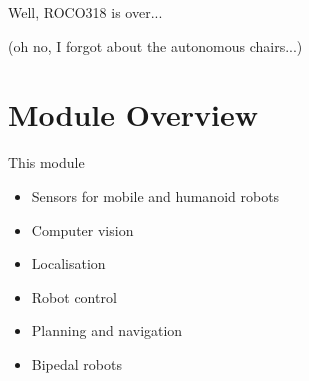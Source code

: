 \documentclass[compress]{beamer}
\begin{document}
\begin{frame}[plain]{}
    Well, ROCO318 is over...

    \pause
    (oh no, I forgot about the autonomous chairs...)
\end{frame}




\section{Module Overview}
\begin{frame}{This module}

\begin{itemize}
\item Sensors for mobile and humanoid robots
\item Computer vision
\item Localisation
\item Robot control
\item Planning and navigation
\item Bipedal robots
\end{itemize}

\end{frame}
\end{document}
